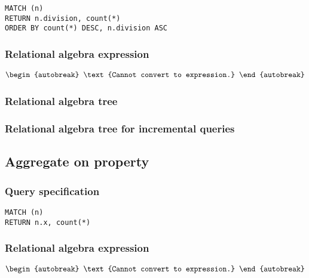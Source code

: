 \begin{lstlisting}
MATCH (n)
RETURN n.division, count(*)
ORDER BY count(*) DESC, n.division ASC
\end{lstlisting}

\subsubsection*{Relational algebra expression}

\begin{align*}
\begin{autobreak}
\text{Cannot convert to expression.}
\end{autobreak}
\end{align*}

\subsubsection*{Relational algebra tree}


\subsubsection*{Relational algebra tree for incremental queries}


\subsection{Aggregate on property}

\subsubsection*{Query specification}

\begin{lstlisting}
MATCH (n)
RETURN n.x, count(*)
\end{lstlisting}

\subsubsection*{Relational algebra expression}

\begin{align*}
\begin{autobreak}
\text{Cannot convert to expression.}
\end{autobreak}
\end{align*}

